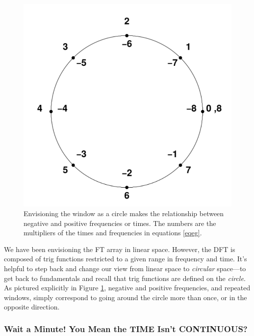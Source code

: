 \documentclass[preprint]{aastex}
\begin{document}
\begin{figure}[H]
\begin{center}
\leavevmode
\includegraphics[width=6.0in]{ftfig1.pdf}
\end{center}
\caption{Envisioning the window as a circle makes the relationship
between negative and positive frequencies or times. The numbers are the
multipliers of the times and frequencies in equations \ref{eqeg}.
\label{ftfig1} }
\end{figure}

\enlargethispage{0.4in}
\noindent We have been envisioning the FT array in linear space. 
However, the DFT is composed of trig functions restricted to a given
range in frequency and time.  It's helpful to step back and change our
view from linear space to {\it circular} space---to get back to
fundamentals and recall that trig functions are defined on the {\it
circle}.  As pictured explicitly in Figure \ref{ftfig1}, negative and
positive frequencies, and repeated windows, simply correspond to going
around the circle more than once, or in the opposite direction.

\subsubsection{Wait a Minute! You Mean the TIME Isn't CONTINUOUS?}
\end{document}
